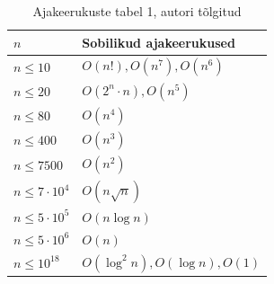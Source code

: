 \documentclass{trkut}
\theoremstyle{definition}
\begin{document}
\begin{table}[H]%
   \caption{Ajakeerukuste tabel 1, autori tõlgitud}%
    \begin{tabular}{|l|l|}
\hline
$n$                & Sobilikud ajakeerukused        \\ \hline
$n\le 10$          & $O(n!), O(n^7), O(n^6)$        \\ \hline
$n\le 20$          & $O(2^n\cdot n), O(n^5)$        \\ \hline
$n\le 80$          & $O(n^4)$                       \\ \hline
$n\le 400$         & $O(n^3)$                       \\ \hline
$n\le 7500$        & $O(n^2)$                       \\ \hline
$n\le 7\cdot 10^4$ & $O(n\sqrt{n})$                 \\ \hline
$n\le 5\cdot 10^5$ & $O(n\log n)$                   \\ \hline
$n\le 5\cdot 10^6$ & $O(n)$                         \\ \hline
$n\le 10^{18}$       & $O(\log ^2n), O(\log n), O(1)$ \\ \hline
\end{tabular}
    \label{timecomplexity}%
\end{table}
\end{document}
